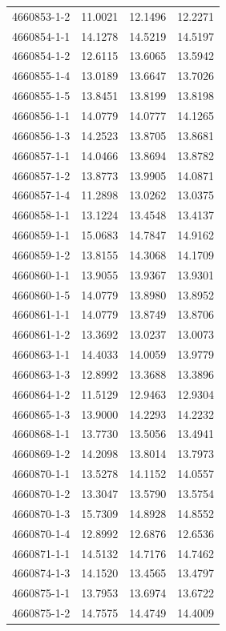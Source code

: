 \begin{longtable}{lrrr}
4660853-1-2 & 11.0021 & 12.1496 & 12.2271 \\
4660854-1-1 & 14.1278 & 14.5219 & 14.5197 \\
4660854-1-2 & 12.6115 & 13.6065 & 13.5942 \\
4660855-1-4 & 13.0189 & 13.6647 & 13.7026 \\
4660855-1-5 & 13.8451 & 13.8199 & 13.8198 \\
4660856-1-1 & 14.0779 & 14.0777 & 14.1265 \\
4660856-1-3 & 14.2523 & 13.8705 & 13.8681 \\
4660857-1-1 & 14.0466 & 13.8694 & 13.8782 \\
4660857-1-2 & 13.8773 & 13.9905 & 14.0871 \\
4660857-1-4 & 11.2898 & 13.0262 & 13.0375 \\
4660858-1-1 & 13.1224 & 13.4548 & 13.4137 \\
4660859-1-1 & 15.0683 & 14.7847 & 14.9162 \\
4660859-1-2 & 13.8155 & 14.3068 & 14.1709 \\
4660860-1-1 & 13.9055 & 13.9367 & 13.9301 \\
4660860-1-5 & 14.0779 & 13.8980 & 13.8952 \\
4660861-1-1 & 14.0779 & 13.8749 & 13.8706 \\
4660861-1-2 & 13.3692 & 13.0237 & 13.0073 \\
4660863-1-1 & 14.4033 & 14.0059 & 13.9779 \\
4660863-1-3 & 12.8992 & 13.3688 & 13.3896 \\
4660864-1-2 & 11.5129 & 12.9463 & 12.9304 \\
4660865-1-3 & 13.9000 & 14.2293 & 14.2232 \\
4660868-1-1 & 13.7730 & 13.5056 & 13.4941 \\
4660869-1-2 & 14.2098 & 13.8014 & 13.7973 \\
4660870-1-1 & 13.5278 & 14.1152 & 14.0557 \\
4660870-1-2 & 13.3047 & 13.5790 & 13.5754 \\
4660870-1-3 & 15.7309 & 14.8928 & 14.8552 \\
4660870-1-4 & 12.8992 & 12.6876 & 12.6536 \\
4660871-1-1 & 14.5132 & 14.7176 & 14.7462 \\
4660874-1-3 & 14.1520 & 13.4565 & 13.4797 \\
4660875-1-1 & 13.7953 & 13.6974 & 13.6722 \\
4660875-1-2 & 14.7575 & 14.4749 & 14.4009 \\

\end{longtable}

